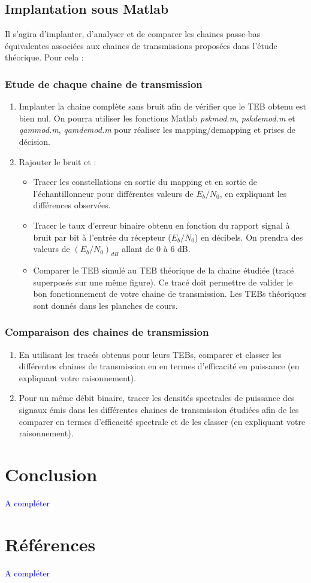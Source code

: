\documentclass{article}
\begin{document}
\subsection{Implantation sous Matlab}
Il s'agira d'implanter, d'analyser et de comparer les chaines passe-bas équivalentes associées aux chaines de transmissions proposées dans l'étude théorique.
Pour cela :
\subsubsection{Etude de chaque chaine de transmission}
\begin{enumerate}
    \item Implanter la chaine complète sans bruit afin de vérifier que le TEB obtenu est bien nul. On pourra utiliser les fonctions Matlab \emph{pskmod.m}, \emph{pskdemod.m }et \emph{qammod.m}, \emph{qamdemod.m} pour réaliser les mapping/demapping et prises de décision.
    \item Rajouter le bruit et :
        \begin{itemize}
            \item Tracer les constellations en sortie du mapping et en sortie de l'échantillonneur pour différentes valeurs de $E_b/N_0$, en expliquant les différences observées.
            \item Tracer le taux d'erreur binaire obtenu en fonction du rapport signal à bruit par bit à l'entrée du récepteur ($E_b/N_0$) en décibels. On prendra des valeurs de $\left(E_b/N_0\right)_{dB}$ allant de $0$ à $6$ dB.
            \item Comparer le TEB simulé au TEB théorique de la chaine étudiée (tracé superposés sur une même figure). Ce tracé doit permettre de valider le bon fonctionnement de votre chaine de transmission. Les TEBs théoriques sont donnés dans les planches de cours.
        \end{itemize}
\end{enumerate}

\subsubsection{Comparaison des chaines de transmission}
\begin{enumerate}
    \item En utilisant les tracés obtenus pour leurs TEBs, comparer et classer les différentes chaines de transmission en en termes d'efficacité en puissance (en expliquant votre raisonnement).
    \item Pour un même débit binaire, tracer les densités spectrales de puissance des signaux émis dans les différentes chaines de transmission étudiées afin de les comparer en termes d'efficacité spectrale et de les classer (en expliquant votre raisonnement).\\
\end{enumerate}

\section{Conclusion}
\textcolor{blue}{A compléter}

\section{Références}
\textcolor{blue}{A compléter}
\end{document}

